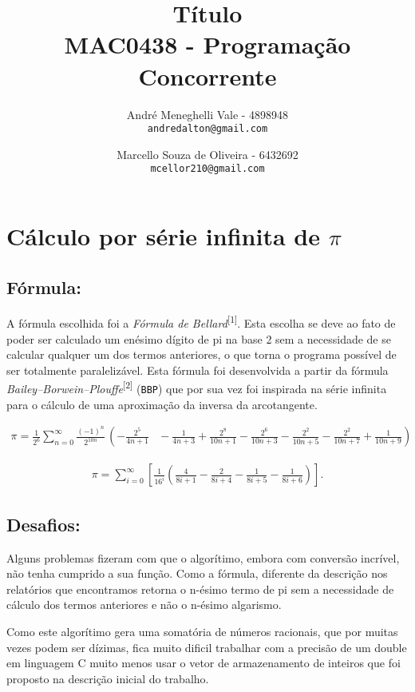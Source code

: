 \documentclass[12pt,a4paper]{article}
\title{Título\\MAC0438 - Programação Concorrente}
\author{
    André Meneghelli Vale - 4898948\\
    \texttt{andredalton@gmail.com}
    \and
    Marcello Souza de Oliveira - 6432692\\
    \texttt{mcellor210@gmail.com}
}
\date{}
\begin{document}
\maketitle

\newpage

\section{Cálculo por série infinita de $\pi$}

\subsection{Fórmula:}
A fórmula escolhida foi a \emph{Fórmula de Bellard}\textsuperscript{[1]}. Esta escolha se deve ao fato de poder ser calculado um enésimo dígito de pi na base 2 sem a necessidade de se calcular qualquer um dos termos anteriores, o que torna o programa possível de ser totalmente paralelizável.
Esta fórmula foi desenvolvida a partir da fórmula \emph{Bailey–Borwein–Plouffe}\textsuperscript{[2]} (\verb+BBP+) que por sua vez foi inspirada na série infinita para o cálculo de uma aproximação da inversa da arcotangente.

\begin{align}
\pi = \frac1{2^6} \sum_{n=0}^\infty \frac{(-1)^n}{2^{10n}} \, \left(-\frac{2^5}{4n+1} \right. & {} - \frac1{4n+3} + \frac{2^8}{10n+1} - \frac{2^6}{10n+3} \left. {} - \frac{2^2}{10n+5} - \frac{2^2}{10n+7} + \frac1{10n+9} \right)
\end{align}

\begin{align}
\pi = \sum_{i = 0}^{\infty}\left[ \frac{1}{16^i} \left( \frac{4}{8i + 1} - \frac{2}{8i + 4} - \frac{1}{8i + 5} - \frac{1}{8i + 6} \right) \right]. 
\end{align}

\subsection{Desafios:}
Alguns problemas fizeram com que o algorítimo, embora com conversão incrível, não tenha cumprido a sua função. Como a fórmula, diferente da descrição nos relatórios que encontramos retorna o n-ésimo termo de pi sem a necessidade de cálculo dos termos anteriores e não o n-ésimo algarismo.

Como este algorítimo gera uma somatória de números racionais, que por muitas vezes podem ser dízimas, fica muito dificil trabalhar com a precisão de um double em linguagem C muito menos usar o vetor de armazenamento de inteiros que foi proposto na descrição inicial do trabalho.
\end{document}
